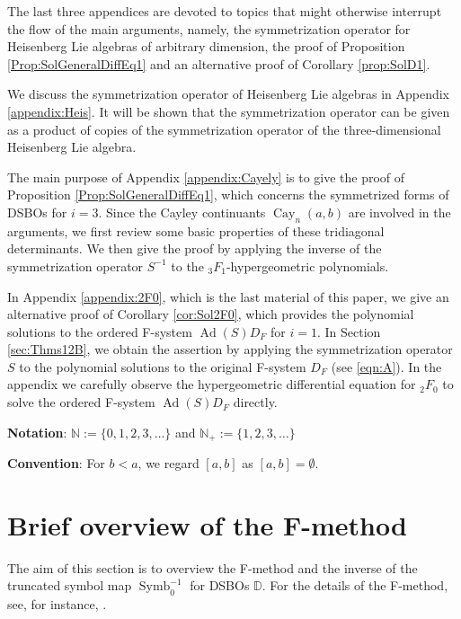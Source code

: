 \documentclass[a4paper,11pt,reqno]{amsart}
\newcommand{\DD}{\mathbb{D}}
\newcommand{\0}{{\bf 0}}
\newcommand{\N}{\mathbb{N}}
\newcommand{\1}{{\bf 1}}
\DeclareMathOperator{\Cay}{Cay}
\DeclareMathOperator{\Ad}{Ad}
\DeclareMathOperator{\Symb}{Symb}
\theoremstyle{plain}
\theoremstyle{definition}
\numberwithin{equation}{section}
\theoremstyle{definition}
\begin{document}
The last three appendices are devoted to topics 
that might otherwise interrupt the flow of the main arguments,
namely, the symmetrization operator for Heisenberg Lie algebras of arbitrary 
dimension, the proof of Proposition \ref{Prop:SolGeneralDiffEq1} 
and an alternative proof 
of Corollary \ref{prop:SolD1}. 

We discuss the symmetrization operator
of Heisenberg Lie algebras in Appendix \ref{appendix:Heis}. 
It will be shown that the symmetrization operator can be 
given as a product of copies of the symmetrization operator of the 
three-dimensional Heisenberg Lie algebra.

The main purpose of Appendix \ref{appendix:Cayely} is to give the proof of 
Proposition \ref{Prop:SolGeneralDiffEq1}, which concerns the symmetrized forms
of DSBOs for $i=3$. Since the Cayley continuants $\Cay_n(a,b)$ are involved in
the arguments, we first review some basic properties of these tridiagonal
determinants. We then give the proof by 
applying the inverse of the symmetrization operator 
$S^{-1}$ to the ${}_3F_1$-hypergeometric polynomials.

In Appendix \ref{appendix:2F0}, which is the last material of this paper, 
we give an alternative proof of Corollary \ref{cor:Sol2F0}, 
which provides
the polynomial solutions to the ordered F-system $\Ad(S)D_F$ for $i=1$. 
In Section \ref{sec:Thms12B}, we obtain the assertion 
by applying the symmetrization operator $S$
to the polynomial solutions to the original F-system $D_F$ (see \eqref{eqn:A}).
In the appendix we carefully observe 
the hypergeometric differential equation for ${}_2F_0$
to solve the ordered F-system $\Ad(S)D_F$ directly.

 
\medskip
\noindent
\textbf{Notation}: 
$\N:=\{0, 1, 2, 3, \ldots\}$ and $\N_+:=\{1, 2, 3, \ldots \}$
\vspace{5pt}

\noindent
\textbf{Convention}:
For $b < a$, we regard $[a,b]$ as $[a,b]=\emptyset$.
\vspace{5pt}

\section{Brief overview of the F-method}
\label{sec:Fmethod}

The aim of this section is to overview the F-method and the inverse 
of the truncated symbol map $\Symb_0^{-1}$ for DSBOs $\DD$. For the details of the F-method, see, for instance, \cite{KoPe16a, KPV25}. 
\end{document}
